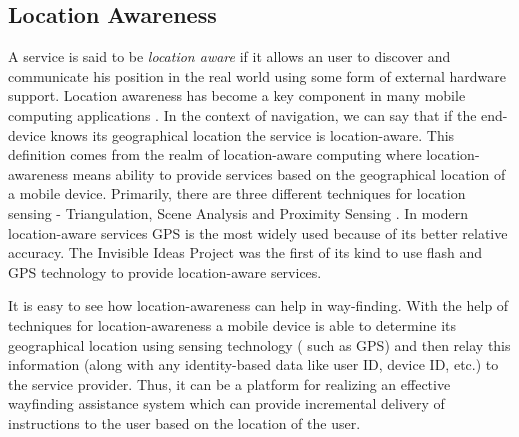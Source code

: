 \documentclass{iitkthesis}
\begin{document}
\subsection{Location Awareness}
A service is said to be \textit{location aware} if it allows an user to 
discover and communicate his position in the real world using some  
form of external hardware support. Location awareness has become 
a key component in many mobile computing applications \cite{parctab}. 
In the context of navigation, we can say that if the end-device knows its 
geographical location the service is location-aware. This definition 
comes from the realm of location-aware computing where location-awareness 
means ability to provide services based on the geographical location of a 
mobile device. Primarily, there are three different techniques for 
location sensing - Triangulation, Scene Analysis and Proximity Sensing 
\cite{hightower}. In modern location-aware services GPS is the 
most widely used because of its better relative accuracy. The Invisible 
Ideas Project \cite{perry} was the first of its kind to use flash and GPS 
technology to provide location-aware services.

It is easy to see how location-awareness can help in way-finding. 
With the help of techniques for location-awareness a mobile device is
able to determine its geographical location using sensing technology (
such as GPS) and then relay this information (along with any 
identity-based data like 
user ID, device ID, etc.) to the service provider. Thus, it can be a platform 
for realizing an effective wayfinding assistance system which can provide 
incremental delivery of instructions to the user based on the location of 
the user. 
\end{document}
